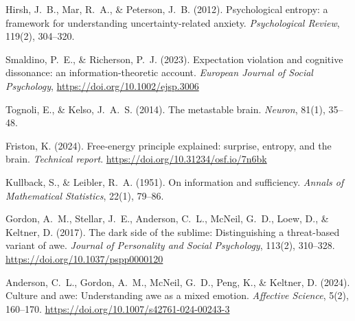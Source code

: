 \documentclass[12pt,a4paper]{article}
\begin{document}

\begin{thebibliography}{9}

Hirsh, J.~B., Mar, R.~A., \& Peterson, J.~B. (2012). Psychological entropy: a framework for understanding uncertainty-related anxiety. \emph{Psychological Review}, 119(2), 304--320.

Smaldino, P.~E., \& Richerson, P.~J. (2023). Expectation violation and cognitive dissonance: an information-theoretic account. \emph{European Journal of Social Psychology}, \url{https://doi.org/10.1002/ejsp.3006}

Tognoli, E., \& Kelso, J.~A.~S. (2014). The metastable brain. \emph{Neuron}, 81(1), 35--48.

Friston, K. (2024). Free-energy principle explained: surprise, entropy, and the brain. \emph{Technical report}. \url{https://doi.org/10.31234/osf.io/7n6bk}

Kullback, S., \& Leibler, R.~A. (1951). On information and sufficiency. \emph{Annals of Mathematical Statistics}, 22(1), 79--86.

Gordon, A.~M., Stellar, J.~E., Anderson, C.~L., McNeil, G.~D., Loew, D., \& Keltner, D. (2017). The dark side of the sublime: Distinguishing a threat-based variant of awe. \emph{Journal of Personality and Social Psychology}, 113(2), 310--328. \url{https://doi.org/10.1037/pspp0000120}

Anderson, C.~L., Gordon, A.~M., McNeil, G.~D., Peng, K., \& Keltner, D. (2024). Culture and awe: Understanding awe as a mixed emotion. \emph{Affective Science}, 5(2), 160--170. \url{https://doi.org/10.1007/s42761-024-00243-3}

\end{thebibliography}
\end{document}

